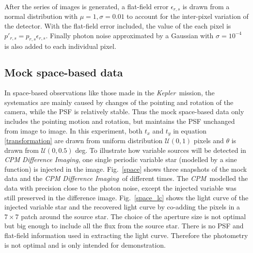 \documentclass[12pt, preprint]{aastex}
\newcommand{\project}[1]{\textsl{#1}}
\newcommand{\cpm}{\project{CPM}}
\newcommand{\cpmdiff}{\project{CPM Difference Imaging}}
\newcommand{\kepler}{\project{Kepler}}
\begin{document}
After the series of images is generated, a flat-field error $\epsilon_{r,s}$ is drawn from a normal distribution with $\mu=1, \sigma=0.01$ to account for the inter-pixel variation of the detector.
With the flat-field error included, the value of the each pixel is $p'_{r,s} = p_{r,s}\epsilon_{r,s}$.
Finally photon noise approximated by a Gaussian with $\sigma = 10^{-4}$ is also added to each individual pixel.

\subsection{Mock space-based data}
In space-based observations like those made in the \kepler\ mission, the systematics are mainly caused by changes of the pointing and rotation of the camera, while the PSF is relatively stable. 
Thus the mock space-based data only includes the pointing motion and rotation, but maintains the PSF unchanged from image to image.
In this experiment,  both $t_x $ and $t_y$ in equation \ref{transformation} are drawn from uniform distribution ${\mathcal {U}}(0,1)$ pixels and $\theta$ is drawn from ${\mathcal {U}}(0,0.5)$ deg. 
To illustrate how variable sources will be detected in \cpmdiff, one single periodic variable star (modelled by a sine function) is injected in the image.
Fig.~\ref{space} shows three snapshots of the mock data and the \cpmdiff\ of different times. 
The \cpm\ modelled the data with precision close to the photon noise, except the injected variable was still preserved in the difference image. 
Fig.~\ref{space_lc} shows the light curve of the injected variable star and the recovered light curve by co-adding the pixels in a $7\times 7$ patch around the source star.
The choice of the aperture size is not optimal but big enough to include all the flux from the source star. 
There is no PSF and flat-field information used in extracting the light curve. 
Therefore the photometry is not optimal and is only intended for demonstration.
\end{document}
